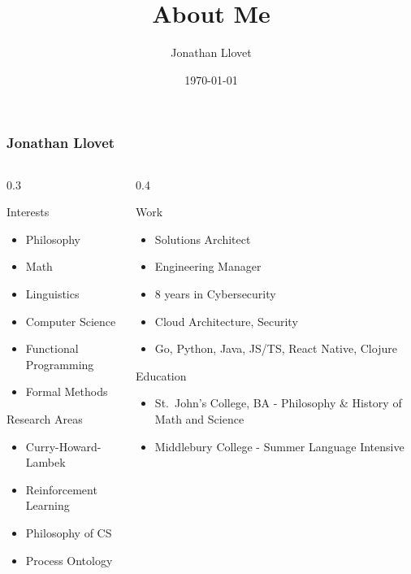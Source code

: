 \documentclass[8pt]{beamer}
\title{About Me}
\author{Jonathan Llovet}
\date{\today}
\begin{document}
\begin{frame}
  \frametitle{Jonathan Llovet}

  \begin{columns}[T]
    \begin{column}{0.3\textwidth}
      \begin{block}{Interests}
        \begin{itemize}
          \item Philosophy
          \item Math
          \item Linguistics
          \item Computer Science
          \item Functional Programming
          \item Formal Methods
        \end{itemize}
      \end{block}
      \begin{block}{Research Areas}
        \begin{itemize}
          \item Curry-Howard-Lambek
          \item Reinforcement Learning
          \item Philosophy of CS
          \item Process Ontology
        \end{itemize}
      \end{block}
    \end{column}
    \begin{column}{0.4\textwidth}
      \begin{block}{Work}
        \begin{itemize}
          \item Solutions Architect
          \item Engineering Manager
          \item 8 years in Cybersecurity
          \item Cloud Architecture, Security
          \item Go, Python, Java, JS/TS, React Native, Clojure
        \end{itemize}
      \end{block}
      \begin{block}{Education}
        \begin{itemize}
          \item St.\ John's College, BA - Philosophy \& History of Math and Science
          \item Middlebury College - Summer Language Intensive

\end{itemize}
\end{block}
\end{column}
\end{columns}
\end{frame}
\end{document}
